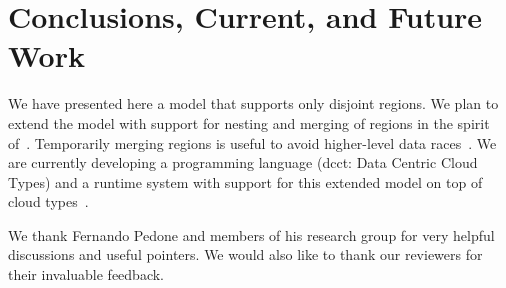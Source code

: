 \documentclass[preprint,numbers]{sigplanconf}
\begin{document}
\section{Conclusions, Current, and Future Work}
\label{sec:conclusion}
We have presented here a model that supports only disjoint regions. We plan to
extend the model with support for nesting and merging of regions in the spirit of~\cite{dolby2012data}.
Temporarily merging regions is useful to avoid higher-level data races~\cite{artho2003high}. We are
currently developing a programming language (dcct: Data Centric Cloud Types)
and a runtime system with 
support for this extended model on top of cloud types~\cite{burckhardt2012cloud}.



\acks We thank Fernando Pedone and members of his research group
for very helpful discussions and useful pointers. We would also like to
thank our reviewers for their invaluable feedback.







\end{document}
